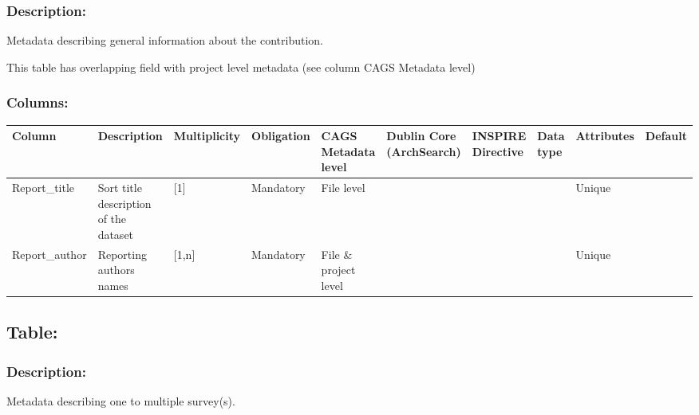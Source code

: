 \documentclass[letterpaper,10pt,english]{sphinxmanual}
\begin{document}
\subsubsection{Description:}
\label{\detokenize{schema_documentation:id16}}
Metadata describing general information about the contribution.

This table has overlapping field with project level metadata (see column
CAGS Metadata level)


\subsubsection{Columns:}
\label{\detokenize{schema_documentation:id17}}

\begin{savenotes}\sphinxattablestart
\centering
\begin{tabulary}{\linewidth}[t]{|T|T|T|T|T|T|T|T|T|T|}
\hline
\sphinxstyletheadfamily 
Column
&\sphinxstyletheadfamily 
Description
&\sphinxstyletheadfamily 
Multiplicity
&\sphinxstyletheadfamily 
Obligation
&\sphinxstyletheadfamily 
CAGS Metadata level
&\sphinxstyletheadfamily 
Dublin Core (ArchSearch)
&\sphinxstyletheadfamily 
INSPIRE Directive
&\sphinxstyletheadfamily 
Data type
&\sphinxstyletheadfamily 
Attributes
&\sphinxstyletheadfamily 
Default
\\
\hline
Report\_title
&
Sort title description of the dataset
&
{[}1{]}
&
Mandatory
&
File level
&&&&
Unique
&\\
\hline
Report\_author
&
Reporting authors names
&
{[}1,n{]}
&
Mandatory
&
File \& project level
&&&&
Unique
&\\
\hline
\end{tabulary}
\par
\sphinxattableend\end{savenotes}


\subsection{Table: }
\label{\detokenize{schema_documentation:table-survey}}

\subsubsection{Description:}
\label{\detokenize{schema_documentation:description-1}}\label{\detokenize{schema_documentation:id18}}
Metadata describing one to multiple survey(s).
\end{document}

